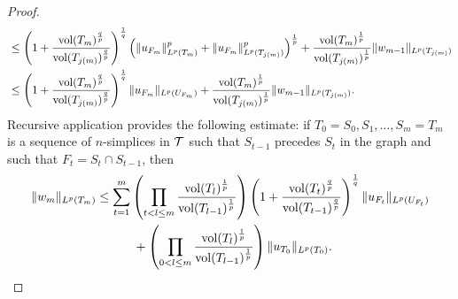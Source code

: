 \documentclass[a4paper]{amsart}
\begin{document}
\begin{proof}
\begin{align*}
    &\leq 
    \left( 1 + \frac{ \operatorname{vol}(T_m)^{\frac q p} }{ \operatorname{vol}(T_{j(m)})^{\frac q p} } \right)^{\frac 1 q}
    \left( 
        \| u_{F_m} \|_{L^{p}(T_m)}^{p}
        +
        \| u_{F_{m}} \|_{L^{p}(T_{j(m)})}^{p}
    \right)^{\frac 1 p}
    +
    \frac{ \operatorname{vol}(T_m)^{\frac 1 p} }{ \operatorname{vol}(T_{j(m)})^{\frac 1 p} }
    \| w_{m-1}\|_{L^{p}(T_{j(m)})}
    \\&\leq 
    \left( 1 + \frac{ \operatorname{vol}(T_m)^{\frac q p} }{ \operatorname{vol}(T_{j(m)})^{\frac q p} } \right)^{\frac 1 q}
    \| u_{F_m} \|_{L^{p}(U_{F_m})} 
    +
    \frac{ \operatorname{vol}(T_m)^{\frac 1 p} }{ \operatorname{vol}(T_{j(m)})^{\frac 1 p} }
    \| w_{m-1}\|_{L^{p}(T_{j(m)})}
    .
 \end{align*}
 Recursive application provides the following estimate:
 if $T_0 = S_0, S_1, \dots, S_m = T_m$ is a sequence of $n$-simplices in ${\mathcal T}$
 such that \color{red}$S_{t-1}$ precedes $S_{t}$ in the graph \color{black} and such that $F_t = S_t \cap S_{t-1}$,
 then 
 \begin{align*}
    \| w_{m} \|_{L^{p}(T_m)}
    &\leq 
    \sum_{t=1}^{m} 
    \left( 
        \prod_{t < l \leq m} 
        \frac{ \operatorname{vol}(T_l)^{\frac 1 p} }{ \operatorname{vol}(T_{l-1})^{\frac 1 p} } 
    \right)
    \left( 1 + \frac{ \operatorname{vol}(T_t)^{\frac q p} }{ \operatorname{vol}(T_{t-1})^{\frac q p} } \right)^{\frac 1 q}
    \| u_{F_t} \|_{L^{p}(U_{F_t})}
    \\&\quad \quad \quad 
    +
    \left( 
        \prod_{0 < l \leq m} 
        \frac{ \operatorname{vol}(T_l)^{\frac 1 p} }{ \operatorname{vol}(T_{l-1})^{\frac 1 p} } 
    \right)
    \| u_{T_0}\|_{L^{p}(T_{0})}
    .
 \end{align*}

\end{proof}
\end{document}
